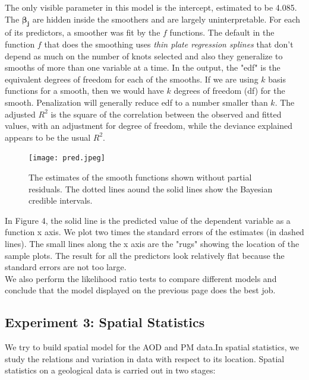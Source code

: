 \documentclass[10pt]{article}
\begin{document}
The only visible parameter in this model is the intercept, estimated to be 4.085. The ${\bm{\beta_{j}}}$ are hidden inside the smoothers and are largely uninterpretable. For each of its predictors, a smoother was fit by the $f$ functions. The default in the function $f$ that does the smoothing uses {\textit{thin plate regression splines}} that don't depend as much on the number of knots selected and also they generalize to smooths of more than one variable at a time. In the output, the "edf" is the equivalent degrees of freedom for each of the smooths. If we are using $k$ basis functions for a smooth, then we would have $k$ degrees of freedom (df) for the smooth. Penalization will generally reduce edf to a number smaller than $k$. The adjusted $R^{2}$ is the square of the correlation between the observed and fitted values, with an adjustment for degree of freedom, while the deviance explained appears to be the usual $R^2$. 



\begin{figure}[H]

\centering
\texttt{[image: pred.jpeg]} 
\caption{The estimates of the smooth functions shown without partial residuals. The dotted lines aound the solid lines show the Bayesian credible intervals.} 
\end{figure} 
In Figure 4, the solid line is the predicted value of the dependent variable as a function x axis. We plot two times the standard errors of the estimates (in dashed lines). The small lines along the x axis are the "rugs" showing the location of the sample plots. The result for all the predictors look relatively flat because the standard errors are not too large. \\ 
We also perform the likelihood ratio tests to compare different models and conclude that the model displayed on the previous page does the best job. 














\subsection{Experiment 3: Spatial Statistics}
We try to build spatial model for the AOD and PM data.In spatial statistics, we study the relations and variation in data with respect to its location. Spatial statistics on a geological data is carried out in two stages:
\end{document}
